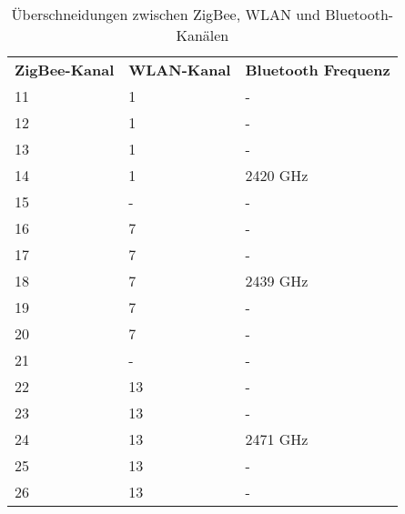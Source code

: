                 \begin{table}
                    \begin{tabular}{lll}
                        \textbf{ZigBee-Kanal} & \textbf{WLAN-Kanal} & \textbf{Bluetooth Frequenz} \\
                        11           & 1          & -\\
                        12           & 1          & -\\
                        13           & 1          & -\\
                        14           & 1          & 2420 GHz\\
                        15           & -          & -\\
                        16           & 7          & -\\
                        17           & 7          & -\\
                        18           & 7          & 2439 GHz\\
                        19           & 7          & -\\
                        20           & 7          & -\\
                        21           & -          & -\\
                        22           & 13         & -\\
                        23           & 13         & -\\
                        24           & 13         & 2471 GHz\\
                        25           & 13         & -\\
                        26           & 13         & -\\
                    \end{tabular}
                    \caption{Überschneidungen zwischen ZigBee, WLAN und Bluetooth-Kanälen}
                    \label{zigbee_wlan_kanaele}
                \end{table}





